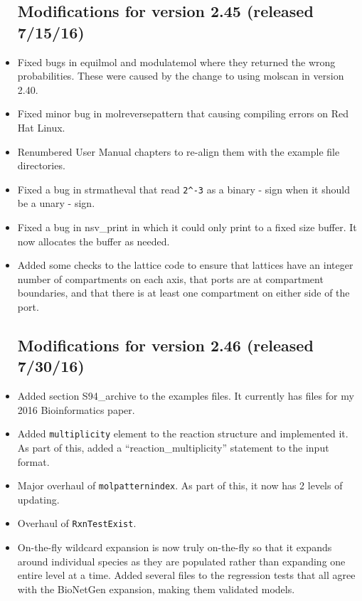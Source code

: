 \documentclass {scrbook}
\newcommand {\ttt} {\texttt}
\begin{document}
\begin{itemize}
\subsection{Modifications for version 2.45 (released 7/15/16)}
\item Fixed bugs in equilmol and modulatemol where they returned the wrong probabilities. These were caused by the change to using molscan in version 2.40.
\item Fixed minor bug in molreversepattern that causing compiling errors on Red Hat Linux.
\item Renumbered User Manual chapters to re-align them with the example file directories.
\item Fixed a bug in strmatheval that read \verb|2^-3| as a binary - sign when it should be a unary - sign.
\item Fixed a bug in nsv\_print in which it could only print to a fixed size buffer. It now allocates the buffer as needed.
\item Added some checks to the lattice code to ensure that lattices have an integer number of compartments on each axis, that ports are at compartment boundaries, and that there is at least one compartment on either side of the port.

\subsection{Modifications for version 2.46 (released 7/30/16)}
\item Added section S94\_archive to the examples files. It currently has files for my 2016 Bioinformatics paper.
\item Added \ttt{multiplicity} element to the reaction structure and implemented it. As part of this, added a ``reaction\_multiplicity'' statement to the input format.
\item Major overhaul of \ttt{molpatternindex}. As part of this, it now has 2 levels of updating.
\item Overhaul of \ttt{RxnTestExist}.
\item On-the-fly wildcard expansion is now truly on-the-fly so that it expands around individual species as they are populated rather than expanding one entire level at a time. Added several files to the regression tests that all agree with the BioNetGen expansion, making them validated models.


\end{itemize}
\end{document}
